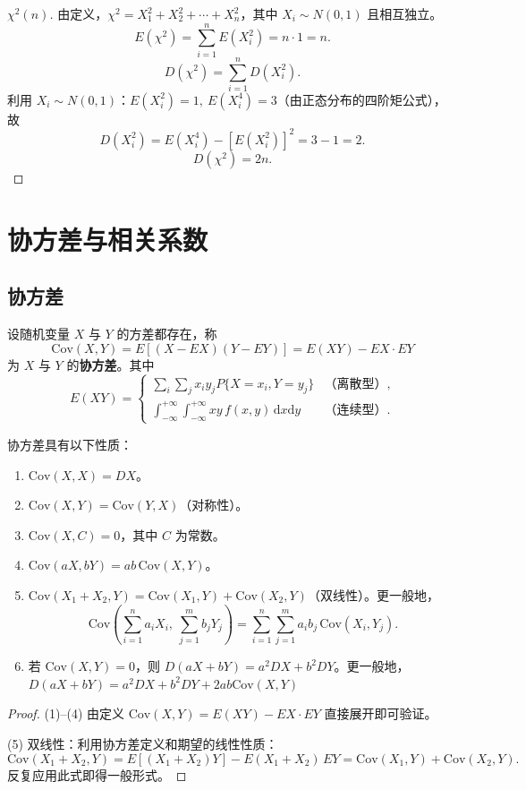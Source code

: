 \documentclass[lang=cn,11pt]{elegantbook}
\begin{document}
\begin{proof}[\(\chi^2(n)\)]
由定义，\(\chi^2 = X_1^2+X_2^2+\cdots+X_n^2\)，其中 \(X_i \sim N(0,1)\) 且相互独立。
\[
E(\chi^2) = \sum_{i=1}^{n}E(X_i^2) = n\cdot 1 = n.
\]
\[
D(\chi^2) = \sum_{i=1}^{n}D(X_i^2).
\]
利用 \(X_i \sim N(0,1)\)：\(E(X_i^2)=1,\ E(X_i^4)=3\)（由正态分布的四阶矩公式），故
\[
D(X_i^2) = E(X_i^4) - [E(X_i^2)]^2 = 3 - 1 = 2.
\]
\[
D(\chi^2) = 2n.
\]
\end{proof}


\section{协方差与相关系数}

\subsection{协方差}

\begin{definition}[协方差] \label{def:covariance}
设随机变量 \(X\) 与 \(Y\) 的方差都存在，称
\[
\mathrm{Cov}(X,Y) = E[(X - EX)(Y - EY)] = E(XY) - EX \cdot EY
\]
为 \(X\) 与 \(Y\) 的\textbf{协方差}。其中
\[
E(XY) = \begin{cases}
\sum\limits_{i}\sum\limits_{j} x_i y_j P\{X=x_i,Y=y_j\} & \text{（离散型）}, \\[8pt]
\int_{-\infty}^{+\infty}\int_{-\infty}^{+\infty} xy\,f(x,y)\,\mathrm{d}x\mathrm{d}y & \text{（连续型）}.
\end{cases}
\]
\end{definition}

\begin{property}\label{prop:covariance}
协方差具有以下性质：
\begin{enumerate}
    \item \(\mathrm{Cov}(X,X) = DX\)。
    \item \(\mathrm{Cov}(X,Y) = \mathrm{Cov}(Y,X)\)（对称性）。
    \item \(\mathrm{Cov}(X,C) = 0\)，其中 \(C\) 为常数。
    \item \(\mathrm{Cov}(aX, bY) = ab\,\mathrm{Cov}(X,Y)\)。
    \item \(\mathrm{Cov}(X_1 + X_2, Y) = \mathrm{Cov}(X_1, Y) + \mathrm{Cov}(X_2, Y)\)（双线性）。更一般地，
    \[
    \mathrm{Cov}\!\left(\sum_{i=1}^{n} a_i X_i,\ \sum_{j=1}^{m} b_j Y_j\right) = \sum_{i=1}^{n}\sum_{j=1}^{m} a_i b_j\,\mathrm{Cov}(X_i, Y_j).
    \]
    \item 若 \(\mathrm{Cov}(X,Y) = 0\)，则 \(D(aX + bY) = a^2 DX + b^2 DY\)。更一般地，\(D(aX + bY) = a^2 DX + b^2 DY+2ab\mathrm{Cov}(X,Y) \)
\end{enumerate}
\end{property}
\begin{proof}
(1)--(4) 由定义 \(\mathrm{Cov}(X,Y)=E(XY)-EX\cdot EY\) 直接展开即可验证。\par
(5) 双线性：利用协方差定义和期望的线性性质：
\[
\mathrm{Cov}(X_1+X_2,Y) = E[(X_1+X_2)Y] - E(X_1+X_2)\,EY = \mathrm{Cov}(X_1,Y)+\mathrm{Cov}(X_2,Y).
\]
反复应用此式即得一般形式。
\end{proof}
\end{document}
